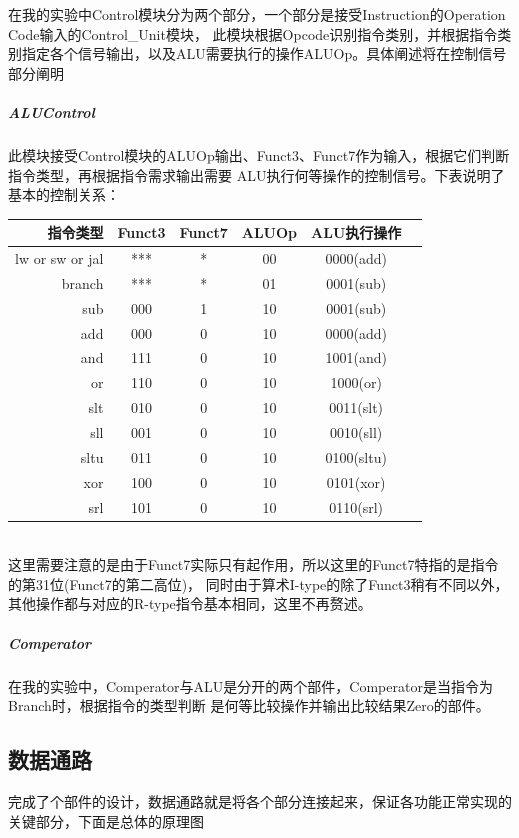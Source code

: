 在我的实验中Control模块分为两个部分，一个部分是接受Instruction的Operation Code输入的Control\_Unit模块，
此模块根据Opcode识别指令类别，并根据指令类别指定各个信号输出，以及ALU需要执行的操作ALUOp。具体阐述将在控制信号部分阐明

\subparagraph{ALUControl}
此模块接受Control模块的ALUOp输出、Funct3、Funct7作为输入，根据它们判断指令类型，再根据指令需求输出需要
ALU执行何等操作的控制信号。下表说明了基本的控制关系：\\

\begin{tabular}{|r|c|c|c|c|l|}
    \hline
    指令类型 & Funct3 & Funct7 & ALUOp & ALU执行操作 \\
    \hline
    lw or sw or jal & *** & * & 00 & 0000(add) \\
    \hline
    branch & *** & * & 01 & 0001(sub) \\
    \hline
    sub & 000 & 1 & 10 & 0001(sub) \\
    \hline
    add & 000 & 0 & 10 & 0000(add) \\
    \hline
    and & 111 & 0 & 10 & 1001(and) \\
    \hline
    or & 110 & 0 & 10 & 1000(or) \\
    \hline
    slt & 010 & 0 & 10 & 0011(slt) \\ 
    \hline
    sll & 001 & 0 & 10 & 0010(sll) \\
    \hline
    sltu & 011 & 0 & 10 & 0100(sltu) \\
    \hline
    xor & 100 & 0 & 10 & 0101(xor) \\
    \hline
    srl & 101 & 0 & 10 & 0110(srl) \\
    \hline
\end{tabular} \\

这里需要注意的是由于Funct7实际只有起作用，所以这里的Funct7特指的是指令的第31位(Funct7的第二高位)，
同时由于算术I-type的除了Funct3稍有不同以外，其他操作都与对应的R-type指令基本相同，这里不再赘述。

\subparagraph{Comperator}
在我的实验中，Comperator与ALU是分开的两个部件，Comperator是当指令为Branch时，根据指令的类型判断
是何等比较操作并输出比较结果Zero的部件。

\subsection{数据通路}
完成了个部件的设计，数据通路就是将各个部分连接起来，保证各功能正常实现的关键部分，下面是总体的原理图

